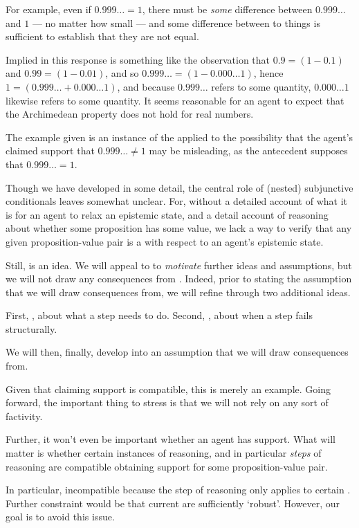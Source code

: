 \begin{note}
  \color{red}
  For example, even if \(0.999\dots = 1\), there must be \emph{some} difference between \(0.999\dots\) and \(1\) --- no matter how small --- and some difference between to things is sufficient to establish that they are not equal.

  Implied in this response is something like the observation that \(0.9 = (1 - 0.1)\) and \(0.99 = (1 - 0.01)\), and so \(0.999\dots = (1 - 0.000\dots 1)\), hence \(1 = (0.999\dots + 0.000\dots 1)\), and because \(0.999\dots\) refers to some quantity, \(0.000\dots 1\) likewise refers to some quantity.
  It seems reasonable for an agent to expect that the Archimedean property does not hold for real numbers.

  The example given is an instance of the applied to the possibility that the agent's claimed support that \(0.999\dots \ne 1\) may be misleading, as the antecedent supposes that \(0.999\dots = 1\).
\end{note}

\begin{note}
  Though we have developed \ideaCSA{} in some detail, the central role of (nested) subjunctive conditionals leaves \ideaCSA{} somewhat unclear.
  For, without a detailed account of what it is for an agent to relax an epistemic state, and a detail account of reasoning about whether some proposition has some value, we lack a way to verify that any given proposition-value pair is a \sink{} with respect to an agent's epistemic state.

  Still, \ideaCSA{} is an idea.
  We will appeal to \ideaCSA{} to \emph{motivate} further ideas and assumptions, but we will not draw any consequences from \ideaCSA{}.
  Indeed, prior to stating the assumption that we will draw consequences from, we will refine \ideaCSA{} through two additional ideas.

  First, \ideaCSB{}, about what a step needs to do.
  Second, \ideaCSC{}, about when a step fails structurally.

  We will then, finally, develop \ideaCSC{} into an assumption that we will draw consequences from.
\end{note}

\begin{note}
  Given that claiming support is compatible, this is merely an example.
  Going forward, the important thing to stress is that we will not rely on any sort of factivity.

  Further, it won't even be important whether an agent has support.
  What will matter is whether certain instances of reasoning, and in particular \emph{steps} of reasoning are compatible obtaining support for some proposition-value pair.

  In particular, incompatible because the step of reasoning only applies to certain .
  Further constraint would be that current  are sufficiently `robust'.
  However, our goal is to avoid this issue.
\end{note}

